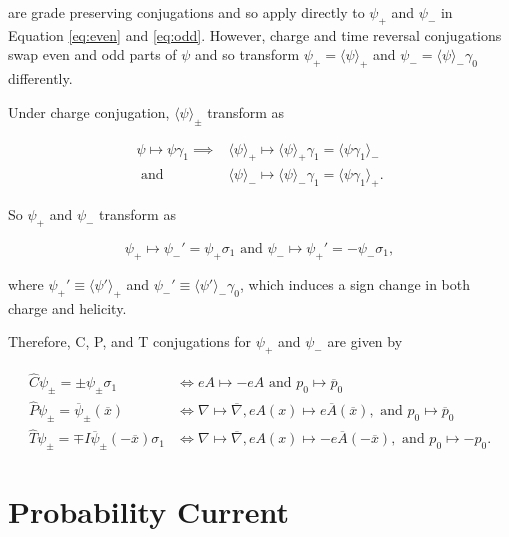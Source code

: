 \documentclass{article}
\begin{document}
  are grade preserving conjugations and so apply directly to $\psi_+$ and $\psi_-$ in Equation \ref{eq:even} and \ref{eq:odd}. However, charge and time reversal conjugations swap even and odd parts of $\psi$ and so transform $\psi_+ = \langle \psi \rangle_+$ and $\psi_- = \langle \psi \rangle_- \gamma_0$ differently.

  Under charge conjugation, $\langle \psi \rangle_\pm$ transform as

  \begin{align}
    \psi \mapsto \psi \gamma_1 \implies 
    &\langle \psi \rangle_+ \mapsto \langle \psi \rangle_+ \gamma_1 = \langle \psi \gamma_1 \rangle_- \\
    \text{ and } 
    &\langle \psi \rangle_- \mapsto \langle \psi \rangle_- \gamma_1 = \langle \psi \gamma_1 \rangle_+.
  \end{align}

  So $\psi_+$ and $\psi_-$ transform as

  \begin{equation}
    \psi_+ \mapsto \psi_-' = \psi_+ \sigma_1
    \text{ and } 
    \psi_- \mapsto \psi_+' = - \psi_- \sigma_1,
  \end{equation}

  where $\psi_+' \equiv \langle \psi' \rangle_+$ and $\psi_-' \equiv \langle \psi' \rangle_- \gamma_0$, which induces a sign change in both charge and helicity.

  Therefore, C, P, and T conjugations for $\psi_+$ and $\psi_-$ are given by

  \begin{align}
    \hat C \psi_\pm = \pm \psi_\pm \sigma_1 &\iff eA \mapsto - eA \text{ and } p_0 \mapsto \overline p_0 \label{eq:pmcharge}\\
    \hat P \psi_\pm = \overline \psi_\pm(\overline x) &\iff \nabla \mapsto \overline \nabla, eA(x) \mapsto e\overline A(\overline x), \text{ and } p_0 \mapsto \overline p_0 \label{eq:pmparity}\\
    \hat T \psi_\pm = \mp I \overline \psi_\pm(-\overline x) \sigma_1 &\iff \nabla \mapsto \overline\nabla, eA(x) \mapsto -e\overline A(-\overline x), \text{ and } p_0 \mapsto - p_0.\label{eq:pmtime}
  \end{align}

  \section{Probability Current}\label{probability}
\end{document}

